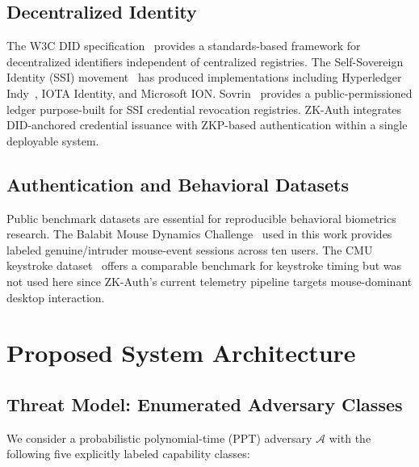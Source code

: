 \documentclass[journal,twoside,10pt]{IEEEtran}
\begin{document}
\subsection{Decentralized Identity}
The W3C DID specification~\cite{w3cdid} provides a standards-based framework
for decentralized identifiers independent of centralized registries. The
Self-Sovereign Identity (SSI) movement~\cite{allen16} has produced
implementations including Hyperledger Indy~\cite{hyperledgerindy}, IOTA
Identity, and Microsoft ION. Sovrin~\cite{sovrin} provides a
public-permissioned ledger purpose-built for SSI credential revocation
registries. ZK-Auth
integrates DID-anchored credential issuance with ZKP-based authentication
within a single deployable system.

\subsection{Authentication and Behavioral Datasets}
Public benchmark datasets are essential for reproducible behavioral
biometrics research. The Balabit Mouse Dynamics Challenge~\cite{balabit}
used in this work provides labeled genuine/intruder mouse-event sessions
across ten users. The CMU keystroke dataset~\cite{killourhy09} offers a
comparable benchmark for keystroke timing but was not used here since
ZK-Auth's current telemetry pipeline targets mouse-dominant desktop
interaction.

\section{Proposed System Architecture}
\label{sec:architecture}

\subsection{Threat Model: Enumerated Adversary Classes}
\label{sec:threatmodel}
We consider a probabilistic polynomial-time (PPT) adversary $\mathcal{A}$
with the following five explicitly labeled capability classes:
\end{document}
